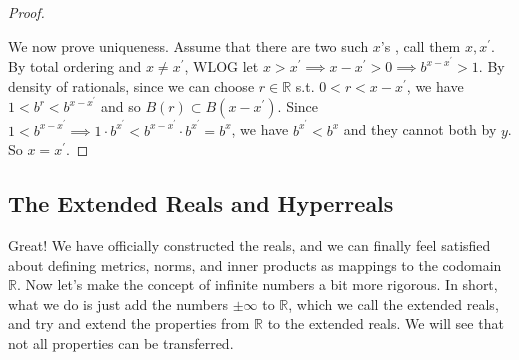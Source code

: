 \begin{proof}
\begin{enumerate}
      \end{enumerate}
      We now prove uniqueness. Assume that there are two such $x$'s , call them $x, x^\prime$. By total ordering and $x \neq x^\prime$, WLOG let $x > x^\prime \implies x - x^\prime > 0 \implies b^{x - x^\prime} > 1$. By density of rationals, since we can choose $r \in \mathbb{R}$ s.t. $0 < r < x - x^\prime$, we have $1 < b^r < b^{x - x^\prime}$ and so $B(r) \subset B(x - x^\prime)$. Since $1 < b^{x - x^\prime} \implies 1 \cdot b^{x^\prime} < b^{x - x^\prime} \cdot b^{x^\prime} = b^x$, we have $b^{x^\prime} < b^x$ and they cannot both by $y$. So $x = x^\prime$. 
    \end{proof}

\subsection{The Extended Reals and Hyperreals}

  Great! We have officially constructed the reals, and we can finally feel satisfied about defining metrics, norms, and inner products as mappings to the codomain $\mathbb{R}$. Now let's make the concept of infinite numbers a bit more rigorous. In short, what we do is just add the numbers $\pm \infty$ to $\mathbb{R}$, which we call the extended reals, and try and extend the properties from $\mathbb{R}$ to the extended reals. We will see that not all properties can be transferred. 

